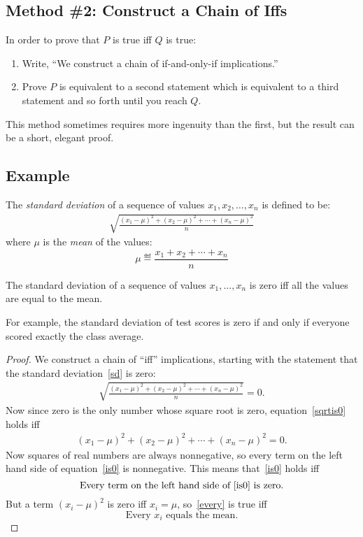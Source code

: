 \subsection{Method \#2:  Construct a Chain of Iffs}
In order to prove that $P$ is true iff $Q$ is true:
%
\begin{enumerate}
\item Write, ``We construct a chain of if-and-only-if implications.''
\item Prove $P$ is equivalent to a second statement which is
equivalent to a third statement and so forth until you reach $Q$.
\end{enumerate}
%
This method sometimes requires more ingenuity than the first, but the
result can be a short, elegant proof.

\subsection*{Example}

The \textit{standard deviation} of a sequence of values $x_1, x_2,
\dots, x_n$ is defined to be:
%
\begin{eqnarray}\label{sd}
\sqrt{\frac{(x_1 - \mu)^2 + (x_2 - \mu)^2 + \cdots + (x_n - \mu)^2}{n}}
\end{eqnarray}
%
where $\mu$ is the \emph{mean} of the values:
%
\[
\mu \eqdef \frac{x_1 + x_2 + \cdots + x_n}{n}
\]

\begin{theorem}
The standard deviation of a sequence of values $x_1, \dots, x_n$ is
zero iff all the values are equal to the mean.
\end{theorem}

For example, the standard deviation of test scores is zero if and only
if everyone scored exactly the class average.

\begin{proof}
We construct a chain of ``iff'' implications, starting with the
statement that the standard deviation~\eqref{sd} is zero:
%
\begin{eqnarray}\label{sqrtis0}
\sqrt{\frac{(x_1 - \mu)^2 + (x_2 - \mu)^2 + \cdots + (x_n - \mu)^2}{n}} = 0.
\end{eqnarray}
%
Now since zero is the only number whose square root is zero,
equation~\eqref{sqrtis0} holds iff
\begin{eqnarray}\label{is0}
(x_1 - \mu)^2 + (x_2 - \mu)^2 + \cdots + (x_n - \mu)^2 = 0.
\end{eqnarray}
Now squares of real numbers are always nonnegative, so every term on the
left hand side of equation~\eqref{is0} is nonnegative.  This means
that~\eqref{is0} holds iff
\begin{equation}\label{every}
\text{Every term on the left hand side of~\eqref{is0} is zero.}
\end{equation}
But a term $(x_i - \mu)^2$ is zero iff $x_i=\mu$, so~\eqref{every} is true
iff
\[
\text{Every $x_i$ equals the mean.}
\]

\end{proof}

